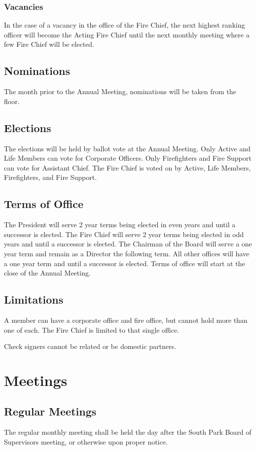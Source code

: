 ﻿\documentclass[12pt,letterpaper]{article}
\begin{document}
\subsubsection{Vacancies}
In the case of a vacancy in the office of the Fire Chief, the next highest ranking officer will become the Acting Fire Chief until the next monthly meeting where a few Fire Chief will be elected.

\subsection{Nominations}
The month prior to the Annual Meeting, nominations will be taken from the floor.

\subsection{Elections}
The elections will be held by ballot vote at the Annual Meeting.  Only Active and Life Members can vote for Corporate Officers.  Only Firefighters and Fire Support can vote for Assistant Chief.  The Fire Chief is voted on by Active, Life Members, Firefighters, and Fire Support.

\subsection{Terms of Office}
The President will serve 2 year terms being elected in even years and until a successor is elected.  The Fire Chief will serve 2 year terms being elected in odd years and until a successor is elected.  The Chairman of the Board will serve a one year term and remain as a Director the following term.   All other offices will have a one year term and until a successor is elected.  Terms of office will start at the close of the Annual Meeting.

\subsection{Limitations}
A member can have a corporate office and fire office, but cannot hold more than one of each.  The Fire Chief is limited to that single office.  

Check signers cannot be related or be domestic partners.

\section{Meetings}

\subsection{Regular Meetings}
The regular monthly meeting shall be held the day after the South Park Board of Supervisors meeting, or otherwise upon proper notice. 
\end{document}
